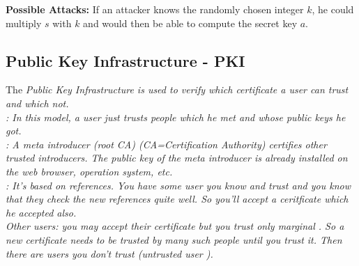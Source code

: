 \textbf{Possible Attacks:} If an attacker knows the randomly chosen integer $k$, he could multiply $s$ with $k$ and would then be able to compute the secret key $a$.


\subsection{Public Key Infrastructure - PKI}
The \em Public Key Infrastructure \em is used to verify which certificate a user can trust and which not.\\
: 
In this model, a user just trusts people which he met and whose public keys he got. \\
: A \em meta introducer \em (root CA) (CA=Certification Authority) certifies other trusted introducers.
The public key of the meta introducer is already installed on the web browser, operation system, etc. \\
: It's based on references. You have some user you know and \em trust \em and you know that they check the new references quite well.
So you'll accept a ceritficate which he accepted also.\\
Other users: you may accept their certificate but you trust only \em marginal \em.
So a new certificate needs to be trusted by many such people until you trust it.
Then there are users you don't trust (\em untrusted user \em).

